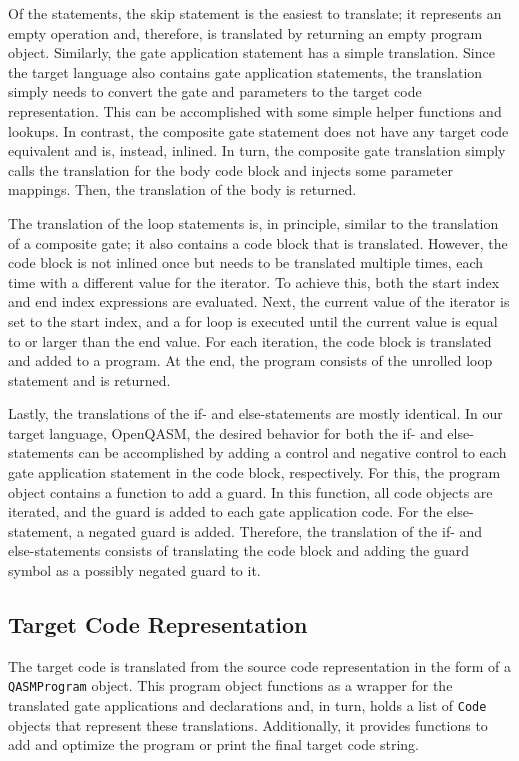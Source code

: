 Of the statements, the skip statement is the easiest to translate; it represents an empty operation and, therefore, is translated by returning an empty program object. Similarly, the gate application statement has a simple translation. Since the target language also contains gate application statements, the translation simply needs to convert the gate and parameters to the target code representation. This can be accomplished with some simple helper functions and lookups. In contrast, the composite gate statement does not have any target code equivalent and is, instead, inlined. In turn, the composite gate translation simply calls the translation for the body code block and injects some parameter mappings. Then, the translation of the body is returned.

The translation of the loop statements is, in principle, similar to the translation of a composite gate; it also contains a code block that is translated. However, the code block is not inlined once but needs to be translated multiple times, each time with a different value for the iterator. To achieve this, both the start index and end index expressions are evaluated. Next, the current value of the iterator is set to the start index, and a for loop is executed until the current value is equal to or larger than the end value. For each iteration, the code block is translated and added to a program. At the end, the program consists of the unrolled loop statement and is returned. 

Lastly, the translations of the if- and else-statements are mostly identical. In our target language, OpenQASM, the desired behavior for both the if- and else-statements can be accomplished by adding a control and negative control to each gate application statement in the code block, respectively. For this, the program object contains a function to add a guard. In this function, all code objects are iterated, and the guard is added to each gate application code. For the else-statement, a negated guard is added. Therefore, the translation of the if- and else-statements consists of translating the code block and adding the guard symbol as a possibly negated guard to it. 

\subsection{Target Code Representation}
\label{sec:implementation_targetCode}
The target code is translated from the source code representation in the form of a \texttt{QASMProgram} object. This program object functions as a wrapper for the translated gate applications and declarations and, in turn, holds a list of \texttt{Code} objects that represent these translations. Additionally, it provides functions to add and optimize the program or print the final target code string. 

